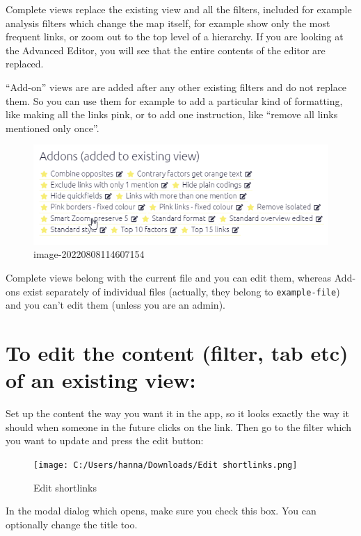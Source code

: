 \documentclass[
]{book}
\begin{document}
Complete views replace the existing view and all the filters, included for example analysis filters which change the map itself, for example show only the most frequent links, or zoom out to the top level of a hierarchy. If you are looking at the Advanced Editor, you will see that the entire contents of the editor are replaced.

``Add-on'' views are are added after any other existing filters and do not replace them. So you can use them for example to add a particular kind of formatting, like making all the links pink, or to add one instruction, like ``remove all links mentioned only once''.

\begin{figure}
\centering
\includegraphics[width=6.77083in,height=\textheight]{_assets/image-20220808114607154.png}
\caption{image-20220808114607154}
\end{figure}

Complete views belong with the current file and you can edit them, whereas Add-ons exist separately of individual files (actually, they belong to \texttt{example-file}) and you can't edit them (unless you are an admin).

\hypertarget{xedit_view}{%
\section{To edit the content (filter, tab etc) of an existing view:}\label{xedit_view}}

Set up the content the way you want it in the app, so it looks exactly the way it should when someone in the future clicks on the link. Then go to the filter which you want to update and press the edit button:

\begin{figure}
\centering
\texttt{[image: C:/Users/hanna/Downloads/Edit shortlinks.png]}
\caption{Edit shortlinks}
\end{figure}

In the modal dialog which opens, make sure you check this box. You can optionally change the title too.
\end{document}
